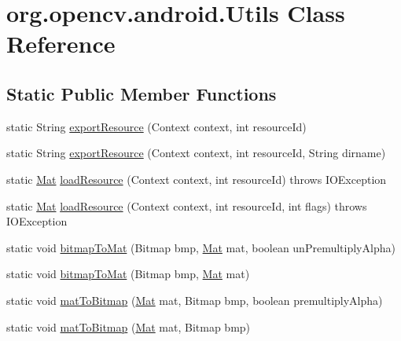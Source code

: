 \hypertarget{classorg_1_1opencv_1_1android_1_1_utils}{}\section{org.\+opencv.\+android.\+Utils Class Reference}
\label{classorg_1_1opencv_1_1android_1_1_utils}
\subsection*{Static Public Member Functions}
\begin{DoxyCompactItemize}
\item 
static String \mbox{\hyperlink{classorg_1_1opencv_1_1android_1_1_utils_a26a7a38f69c5de24bb2b4c15dca27567}{export\+Resource}} (Context context, int resource\+Id)
\item 
static String \mbox{\hyperlink{classorg_1_1opencv_1_1android_1_1_utils_a495b57da9aab4d1793222fd749f22330}{export\+Resource}} (Context context, int resource\+Id, String dirname)
\item 
static \mbox{\hyperlink{classorg_1_1opencv_1_1core_1_1_mat}{Mat}} \mbox{\hyperlink{classorg_1_1opencv_1_1android_1_1_utils_a59d62bc6ac6bea5f9bc7c158dab3114a}{load\+Resource}} (Context context, int resource\+Id)  throws I\+O\+Exception     
\item 
static \mbox{\hyperlink{classorg_1_1opencv_1_1core_1_1_mat}{Mat}} \mbox{\hyperlink{classorg_1_1opencv_1_1android_1_1_utils_a5df87829300a23ef0c91bd641a76adb0}{load\+Resource}} (Context context, int resource\+Id, int flags)  throws I\+O\+Exception     
\item 
static void \mbox{\hyperlink{classorg_1_1opencv_1_1android_1_1_utils_a6f6725aea74948d60a7f6e7dddfabf13}{bitmap\+To\+Mat}} (Bitmap bmp, \mbox{\hyperlink{classorg_1_1opencv_1_1core_1_1_mat}{Mat}} mat, boolean un\+Premultiply\+Alpha)
\item 
static void \mbox{\hyperlink{classorg_1_1opencv_1_1android_1_1_utils_a73261b5ffc4fedb2f0eff22d96d795d1}{bitmap\+To\+Mat}} (Bitmap bmp, \mbox{\hyperlink{classorg_1_1opencv_1_1core_1_1_mat}{Mat}} mat)
\item 
static void \mbox{\hyperlink{classorg_1_1opencv_1_1android_1_1_utils_a97b0bf6900d7a26528d121565c8f824a}{mat\+To\+Bitmap}} (\mbox{\hyperlink{classorg_1_1opencv_1_1core_1_1_mat}{Mat}} mat, Bitmap bmp, boolean premultiply\+Alpha)
\item 
static void \mbox{\hyperlink{classorg_1_1opencv_1_1android_1_1_utils_a234945b6367c9072a6a94d68dedc888c}{mat\+To\+Bitmap}} (\mbox{\hyperlink{classorg_1_1opencv_1_1core_1_1_mat}{Mat}} mat, Bitmap bmp)
\end{DoxyCompactItemize}


